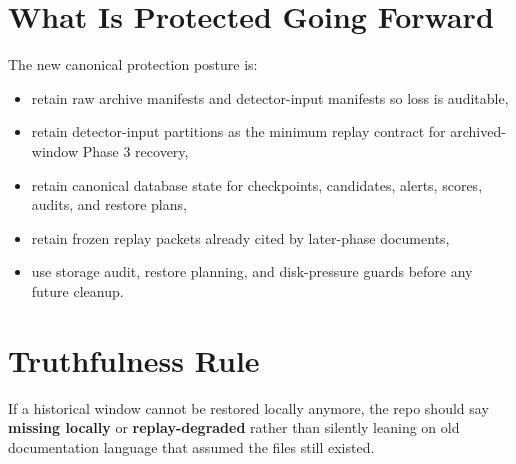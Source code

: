 \documentclass{article}
\begin{document}
\section*{What Is Protected Going Forward}
The new canonical protection posture is:
\begin{itemize}
\item retain raw archive manifests and detector-input manifests so loss is auditable,
\item retain detector-input partitions as the minimum replay contract for archived-window Phase 3 recovery,
\item retain canonical database state for checkpoints, candidates, alerts, scores, audits, and restore plans,
\item retain frozen replay packets already cited by later-phase documents,
\item use storage audit, restore planning, and disk-pressure guards before any future cleanup.
\end{itemize}

\section*{Truthfulness Rule}
If a historical window cannot be restored locally anymore, the repo should say \textbf{missing locally} or \textbf{replay-degraded} rather than silently leaning on old documentation language that assumed the files still existed.
\end{document}
